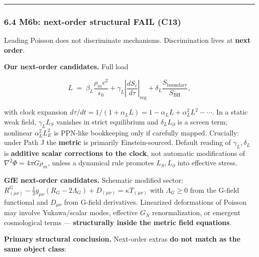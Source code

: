 \documentclass[
  11pt,
]{article}
\begin{document}
\begin{center}\rule{0.5\linewidth}{0.5pt}\end{center}

\subsubsection{\texorpdfstring{6.4 M6b: next-order structural FAIL (\textbf{C13})}{6.4 M6b: next-order structural FAIL (C13)}}\label{m6b-next-order-structural-fail-c13}

Leading Poisson does not discriminate mechanisms. Discrimination lives at \textbf{next order}.

\textbf{Our next-order candidates.} Full load

\[
L \;=\; \beta_L\frac{\rho_m c^2}{\epsilon_0} + \gamma_L\left|\frac{dS_c}{d\tau}\right|_{\mathrm{reg}} + \delta_L\frac{S_{\mathrm{boundary}}}{S_{\mathrm{BH}}},
\]

with clock expansion \(d\tau/dt=1/(1+\alpha_L L)=1-\alpha_L L+\alpha_L^2 L^2-\cdots\). In a static weak field, \(\gamma_L L_S\) vanishes in strict equilibrium and \(\delta_L L_\partial\) is a screen term; nonlinear \(\alpha_L^2 L_E^2\) is PPN-like bookkeeping only if carefully mapped. Crucially: under Path J the \textbf{metric} is primarily Einstein-sourced. Default reading of \(\gamma_L,\delta_L\) is \textbf{additive scalar corrections to the clock}, not automatic modifications of \(\nabla^2\Phi=4\pi G\rho_m\), unless a dynamical rule promotes \(L_S,L_\partial\) into effective stress.

\textbf{GfE next-order candidates.} Schematic modified sector: \(R^G_{(\mu\nu)}-\frac12 g_{\mu\nu}(R_G-2\Lambda_G)+D_{(\mu\nu)}=\kappa T_{(\mu\nu)}\) with \(\Lambda_G\ge 0\) from the G-field functional and \(D_{\mu\nu}\) from G-field derivatives. Linearized deformations of Poisson may involve Yukawa/scalar modes, effective \(G_N\) renormalization, or emergent cosmological terms --- \textbf{structurally inside the metric field equations}.

\textbf{Primary structural conclusion.} Next-order extras \textbf{do not match as the same object class}:
\end{document}
